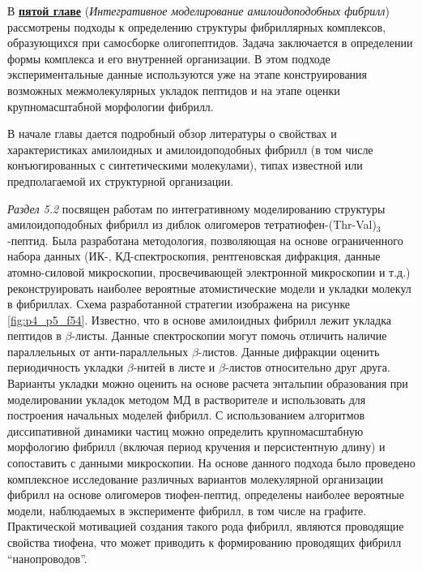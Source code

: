 В \underline{\textbf{пятой главе}} (\textit{Интегративное моделирование амилоидоподобных фибрилл}) рассмотрены подходы к определению структуры фибриллярных комплексов, образующихся при самосборке олигопептидов. Задача заключается в определении формы комплекса и его внутренней организации.
В этом подходе экспериментальные данные используются уже на этапе конструирования возможных межмолекулярных укладок пептидов и на этапе оценки крупномасштабной морфологии фибрилл.

В начале главы дается подробный обзор литературы о свойствах и характеристиках амилоидных и амилоидоподобных фибрилл (в том числе конъюгированных с синтетическими молекулами), типах известной или предполагаемой их структурной организации. 

\textit{Раздел 5.2} посвящен работам по интегративному моделированию структуры амилоидоподобных фибрилл из диблок олигомеров тетратиофен-(Thr-Val)$_3$-пептид. Была разработана методология, позволяющая на основе ограниченного набора данных (ИК-, КД-спектроскопия, рентгеновская дифракция, данные атомно-силовой микроскопии, просвечивающей электронной микроскопии и т.д.) реконструировать наиболее вероятные атомистические модели и укладки молекул в фибриллах. Схема разработанной стратегии изображена на рисунке \ref{fig:p4_p5_f54}. Известно, что в основе амилоидных фибрилл  лежит укладка пептидов в $\beta$-листы.
Данные спектроскопии могут помочь отличить наличие параллельных от анти-параллельных $\beta$-листов. Данные дифракции оценить периодичность укладки $\beta$-нитей в листе и $\beta$-листов относительно друг друга. Варианты укладки можно оценить на основе расчета энтальпии образования при моделировании укладок методом МД в растворителе и использовать для построения начальных моделей фибрилл. С использованием алгоритмов диссипативной динамики частиц можно определить крупномасштабную морфологию фибрилл (включая период кручения и персистентную длину) и сопоставить с данными микроскопии. На основе данного подхода было проведено комплексное исследование различных вариантов молекулярной организации фибрилл на основе олигомеров тиофен-пептид, определены наиболее вероятные модели, наблюдаемых в эксперименте фибрилл, в том числе на графите. Практической мотивацией создания такого рода фибрилл, являются проводящие свойства тиофена, что может приводить к формированию проводящих фибрилл ``нанопроводов''.  

